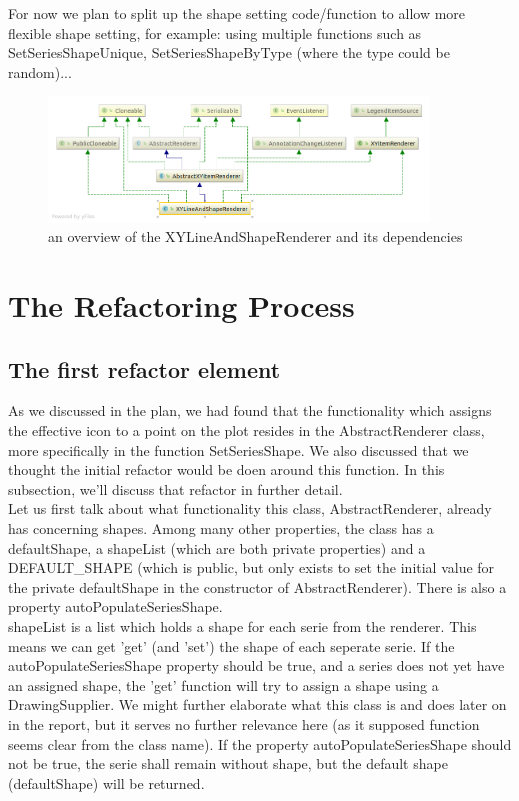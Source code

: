 \documentclass{article}
\begin{document}
For now we plan to split up the shape setting code/function to allow more flexible shape setting, for example: using multiple functions such as SetSeriesShapeUnique, SetSeriesShapeByType (where the type could be random)...

\begin{figure}[H]
\centering
	\includegraphics[width=0.9\textwidth]{XYLineAndShapeRenderer.png}
	\caption{an overview of the XYLineAndShapeRenderer and its dependencies}
\end{figure}

\section{The Refactoring Process}

\subsection{The first refactor element}

As we discussed in the plan, we had found that the functionality which assigns the effective icon to a point on the plot resides in the AbstractRenderer class, more specifically in the function SetSeriesShape. We also discussed that we thought the initial refactor would be doen around this function. In this subsection, we'll discuss that refactor in further detail.\\

Let us first talk about what functionality this class, AbstractRenderer, already has concerning shapes. Among many other properties, the class has a defaultShape, a shapeList (which are both private properties) and a DEFAULT\_SHAPE (which is public, but only exists to set the initial value for the private defaultShape in the constructor of AbstractRenderer). There is also a property autoPopulateSeriesShape.\\

shapeList is a list which holds a shape for each serie from the renderer.
This means we can get 'get' (and 'set') the shape of each seperate serie. If the autoPopulateSeriesShape property should be true, and a series does not yet have an assigned shape, the 'get' function will try to assign a shape using a DrawingSupplier. We might further elaborate what this class is and does later on in the report, but it serves no further relevance here (as it supposed function seems clear from the class name). If the property autoPopulateSeriesShape should not be true, the serie shall remain without shape, but the default shape (defaultShape) will be returned.\\ 
\end{document}
